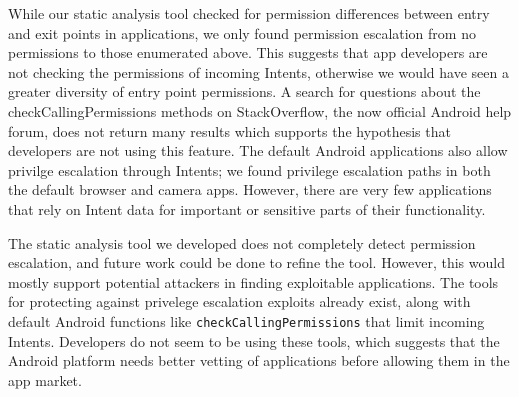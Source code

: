 \documentclass[12pt,a4paper]{article}
\begin{document}
While our static analysis tool checked for permission differences between entry
and exit points in applications, we only found permission escalation from no
permissions to those enumerated above. This suggests that app developers are not
checking the permissions of incoming Intents, otherwise we would have seen a
greater diversity of entry point permissions. A search for questions about the
checkCallingPermissions methods on StackOverflow, the now official Android help
forum, does not return many results which supports the hypothesis that
developers are not using this feature. The default Android applications also
allow privilge escalation through Intents; we found privilege escalation paths
in both the default browser and camera apps.  However, there are very few
applications that rely on Intent data for important or sensitive parts of their
functionality.

The static analysis tool we developed does not completely detect permission
escalation, and future work could be done to refine the tool. However, this
would mostly support potential attackers in finding exploitable applications.
The tools \cite{lu_chex_2012} for protecting against privelege escalation
exploits already exist, along with default Android functions like
\texttt{checkCallingPermissions} that limit incoming Intents. Developers do not seem to
be using these tools, which suggests that the Android platform needs better
vetting of applications before allowing them in the app market.

\end{document}
